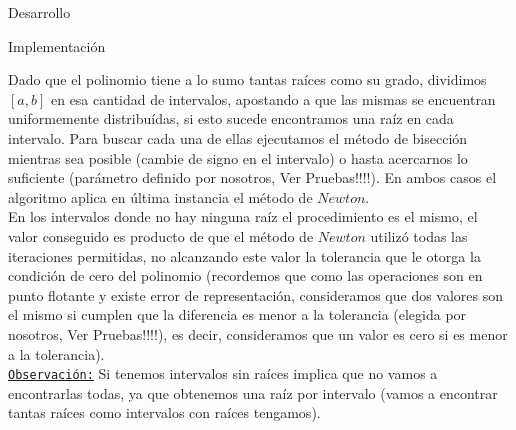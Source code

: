 \begin{section}{Desarrollo}
\begin{subsection}{Implementación}
\begin{itemize}
				Dado que el polinomio tiene a lo sumo tantas raíces como su grado, dividimos $[a,b]$ en esa cantidad de intervalos, apostando a que
				las mismas se encuentran uniformemente distribuídas, si esto sucede encontramos una raíz en cada intervalo. Para buscar cada una de 
				ellas ejecutamos el método de bisección mientras sea posible (cambie de signo en el intervalo) o hasta acercarnos lo suficiente
				(parámetro definido por nosotros, Ver Pruebas!!!!). En ambos casos el algoritmo aplica en última instancia el método de $Newton$.\\
				En los intervalos donde no hay ninguna raíz el procedimiento es el mismo, el valor conseguido es producto de que el método de 
				$Newton$ utilizó todas las iteraciones permitidas, no alcanzando este valor la tolerancia que le otorga la condición de cero del
				polinomio (recordemos que como las operaciones son en punto flotante y existe error de representación, consideramos que dos valores
				son el mismo si cumplen que la diferencia es menor a la tolerancia (elegida por nosotros, Ver Pruebas!!!!), es decir, consideramos que un valor es cero si es menor a la tolerancia).\\
				
				\underline{\texttt{Observación:}} Si tenemos intervalos sin raíces implica que no vamos a encontrarlas todas, ya que obtenemos una raíz por intervalo (vamos a encontrar tantas raíces como intervalos con raíces tengamos).\\
				

\end{itemize}
\end{subsection}
\end{section}
